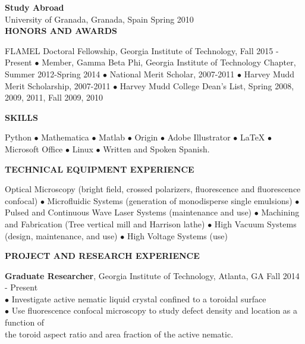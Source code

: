 \documentclass[10pt]{article}
\newenvironment{changemargin}[2]{%
  \list{}{\rightmargin#2\leftmargin#1
    \parsep=0pt\topsep=1pt\partopsep=0pt}
\item[]} {\endlist}
\newenvironment{indentmore}{\begin{changemargin}{10pt}{0cm}}{\end{changemargin}}
\begin{document}
\vspace{5pt}
\textbf{Study Abroad} \\
\hspace*{10pt}University of Granada, Granada, Spain \hfill Spring 2010\\


\textbf{\large HONORS AND AWARDS} 
\begin{indentmore}
FLAMEL Doctoral Fellowship, Georgia Institute of Technology, Fall 2015 - Present $\bullet$  Member, Gamma Beta Phi, Georgia Institute of Technology Chapter, Summer 2012-Spring 2014 $\bullet$ National Merit Scholar, 2007-2011 $\bullet$ Harvey Mudd Merit Scholarship, 2007-2011 $\bullet$ Harvey Mudd College Dean's List, Spring 2008, 2009, 2011, Fall 2009, 2010
\end{indentmore}

\vspace{10pt}
\textbf{\large SKILLS} 
\begin{indentmore}
Python  $\bullet$ Mathematica $\bullet$ Matlab $\bullet$
Origin  
$\bullet$ Adobe Illustrator $\bullet$ LaTeX $\bullet$ Microsoft Office $\bullet$ Linux $\bullet$  Written and Spoken Spanish.	
\end{indentmore}
\vspace{10pt}

\textbf{\large TECHNICAL EQUIPMENT EXPERIENCE}
\begin{indentmore}
Optical Microscopy (bright field, crossed polarizers, fluorescence and fluorescence confocal)  
$\bullet$ Microfluidic Systems (generation of monodisperse single emulsions) 
$\bullet$ Pulsed and Continuous Wave Laser Systems (maintenance and use) 
$\bullet$ Machining and Fabrication (Tree vertical mill and Harrison lathe) 
$\bullet$ High Vacuum Systems (design, maintenance, and use) 
$\bullet$ High Voltage Systems (use)
\end{indentmore}
\vspace{10pt}

\textbf{\large PROJECT AND RESEARCH EXPERIENCE} 

{\bf Graduate Researcher}, Georgia Institute of Technology, Atlanta, GA \hfill Fall 2014 - Present\\
\hspace*{10pt}$\bullet$ Investigate active nematic liquid crystal confined to a toroidal surface\\
\hspace*{10pt}$\bullet$ Use fluorescence confocal microscopy to study defect density and location as a function of \\ \hspace*{15pt} the toroid aspect ratio and area fraction of the active nematic.\\
\end{document}
